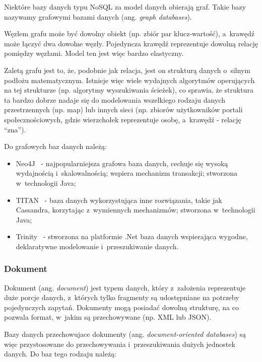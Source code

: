 Niektóre bazy danych typu NoSQL za model danych obierają graf.
Takie bazy nazywamy grafowymi bazami danych (ang. \emph{graph databases}).

Węzłem grafu może być dowolny obiekt (np. zbiór par klucz-wartość), a~krawędź może łączyć dwa dowolne węzły.
Pojedyncza krawędź reprezentuje dowolną relację pomiędzy węzłami.
Model ten jest więc bardzo elastyczny.

Zaletą grafu jest to, że, podobnie jak relacja, jest on strukturą danych o~silnym podłożu matematycznym.
Istnieje więc wiele wydajnych algorytmów operujących na tej strukturze (np. algorytmy wyszukiwania ścieżek), co sprawia, że struktura ta bardzo dobrze nadaje się do modelowania wszelkiego rodzaju danych przestrzennych (np. map) lub innych sieci (np. zbiorów użytkowników portali społecznościowych, gdzie wierzchołek reprezentuje osobę, a~krawędź - relację ``zna'').

Do grafowych baz danych należą:

\begin{itemize}
 \item Neo4J~\cite{neo4j} - najpopularniejsza grafowa baza danych, cechuje się wysoką wydajnością i~skalowalnością; wspiera mechanizm transakcji; stworzona w~technologii Java;
 \item TITAN~\cite{titan} - baza danych wykorzystująca inne rozwiązania, takie jak Cassandra, korzytając z~wymiennych mechanizmów; stworzona w~technologii Java;
 \item Trinity~\cite{trinity} - stworzona na platformie .Net baza danych wspierająca wygodne, deklaratywne modelowanie i~przeszukiwanie danych.
\end{itemize}

\subsubsection{Dokument}

Dokument (ang. \emph{document}) jest typem danych, który z~założenia reprezentuje duże porcje danych, z~których tylko fragmenty są udostępniane na potrzeby pojedynczych zapytań.
Dokumenty mogą posiadać dowolną strukturę, na co pozwala format, w~jakim są przechowywane (np. XML lub JSON).

Bazy danych przechowujace dokumenty (ang. \emph{document-oriented databases}) są więc przystosowane do przechowywania i~przeszukiwania dużych jednostek danych.
Do baz tego rodzaju należą:

